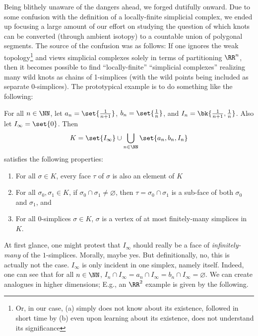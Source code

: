 Being blithely unaware of the dangers ahead, we forged dutifully
onward. Due to some confusion with the definition of a locally-finite
simplicial complex, we ended up focusing a large amount of our effort
on studying the question of which knots can be converted (through
ambient isotopy) to a countable union of polygonal segments. The
source of the confusion was as follows: If one ignores the weak
topology\footnote{Or, in our case, (a) simply does not know about its
  existence, followed in short time by (b) even upon learning about
  its existence, does not understand its significance} and views
simplicial complexes solely in terms of partitioning $\RR^n$, then it
becomes possible to find ``locally-finite'' ``simplicial complexes''
realizing many wild knots as chains of 1-simplices (with the wild
points being included as separate $0$-simplices). The prototypical
example is to do something like the following:
\begin{leftbar}
  For all $n \in \NN$, let $a_n = \set{\frac{1}{n+1}}$, $b_n =
  \set{\frac{1}{n}}$, and $I_n = \bk{\frac{1}{n+1}, \frac{1}{n}}$.
  Also let $I_\infty = \set{0}$. Then
  \[
    K = \set{I_\infty} \cup \bigcup_{n \in \NN} \set{a_n, b_n, I_n}
  \]
  satisfies the following properties:
  \begin{enumerate}
    \item For all $\sigma \in K$, every face $\tau$ of $\sigma$ is
      also an element of $K$
    \item For all $\sigma_0, \sigma_1 \in K$, if $\sigma_0 \cap
      \sigma_1 \neq \varnothing$, then $\tau = \sigma_0 \cap \sigma_1$
      is a sub-face of both $\sigma_0$ and $\sigma_1$, and
    \item For all $0$-simplices $\sigma \in K$, $\sigma$ is a vertex
      of at most finitely-many simplices in $K$.
  \end{enumerate}
\end{leftbar}
At first glance, one might protest that $I_\infty$ should really be a
face of \emph{infinitely-many} of the $1$-simplices. Morally, maybe
yes. But definitionally, no, this is actually not the case. $I_\infty$
is only incident in one simplex, namely itself. Indeed, one can see
that for all $n \in \NN$, $I_n \cap I_\infty = a_n \cap I_\infty = b_n
\cap I_\infty = \varnothing$. We can create analogues in higher
dimensions; E.g., an $\RR^2$ example is given by the following.
